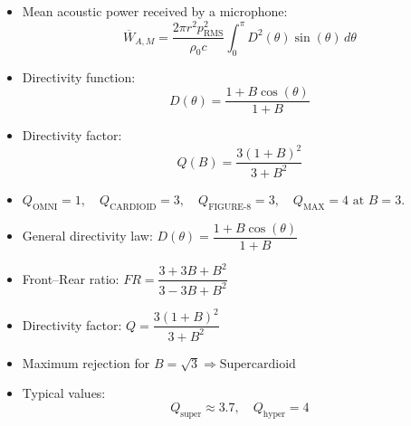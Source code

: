 \begin{tcolorbox}[colback=gray!10!white,colframe=black,title=\textbf{Summary – Directivity Factor and Solid-Angle Integration}]
\begin{itemize}
    \item Mean acoustic power received by a microphone:
    \[
    \overline{W}_{A,M} = \frac{2\pi r^2 p_{\text{RMS}}^2}{\rho_0 c} \int_{0}^{\pi} D^2(\theta) \sin(\theta)\, d\theta
    \]
    \item Directivity function:
    \[
    D(\theta) = \frac{1 + B\cos(\theta)}{1 + B}
    \]
    \item Directivity factor:
    \[
    Q(B) = \frac{3(1 + B)^2}{3 + B^2}
    \]
    \item \( Q_{\text{OMNI}} = 1, \quad Q_{\text{CARDIOID}} = 3, \quad Q_{\text{FIGURE-8}} = 3, \quad Q_{\text{MAX}} = 4 \text{ at } B = 3. \)
\end{itemize}
\end{tcolorbox}


\begin{tcolorbox}[colback=gray!10!white,colframe=black,title=\textbf{Summary – Hypercardioid and Supercardioid Microphones}]
\begin{itemize}
    \item General directivity law: \( D(\theta) = \dfrac{1 + B\cos(\theta)}{1 + B} \)
    \item Front–Rear ratio: \( FR = \dfrac{3 + 3B + B^2}{3 - 3B + B^2} \)
    \item Directivity factor: \( Q = \dfrac{3(1 + B)^2}{3 + B^2} \)
    \item Maximum rejection for \( B = \sqrt{3} \Rightarrow \text{Supercardioid} \)
    \item Typical values:
    \[
    Q_{\text{super}} \approx 3.7, \quad Q_{\text{hyper}} = 4
    \]
\end{itemize}
\end{tcolorbox}



